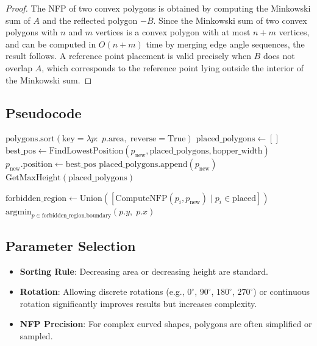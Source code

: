 \begin{proof}
The NFP of two convex polygons is obtained by computing the Minkowski sum of $A$ and the reflected polygon $-B$. Since the Minkowski sum of two convex polygons with $n$ and $m$ vertices is a convex polygon with at most $n + m$ vertices, and can be computed in $O(n+m)$ time by merging edge angle sequences, the result follows. A reference point placement is valid precisely when $B$ does not overlap $A$, which corresponds to the reference point lying outside the interior of the Minkowski sum.
\end{proof}

\subsection{Pseudocode}
\begin{algorithm}[ht]
\label{alg:hopper_optimize}
\begin{algorithmic}[1]
    \State $\text{polygons}.\text{sort}(\text{key}=\lambda p{:}\; p.\text{area},\; \text{reverse}=\text{True})$
    \State $\text{placed\_polygons} \gets []$
        \State $\text{best\_pos} \gets \text{FindLowestPosition}(p_{\text{new}}, \text{placed\_polygons}, \text{hopper\_width})$
        \State $p_{\text{new}}.\text{position} \gets \text{best\_pos}$
        \State $\text{placed\_polygons}.\text{append}(p_{\text{new}})$
    \EndFor
    \State \Return $\text{GetMaxHeight}(\text{placed\_polygons})$
\EndFunction

    \State $\text{forbidden\_region} \gets \text{Union}([\text{ComputeNFP}(p_i, p_{\text{new}}) \mid p_i \in \text{placed}])$
    \State \Return $\text{argmin}_{p \in \text{forbidden\_region.boundary}} (p.y,\; p.x)$
\EndFunction
\end{algorithmic}
\end{algorithm}

\subsection{Parameter Selection}
\begin{itemize}
    \item \textbf{Sorting Rule}: Decreasing area or decreasing height are standard.
    \item \textbf{Rotation}: Allowing discrete rotations (e.g., $0^\circ$, $90^\circ$, $180^\circ$, $270^\circ$) or continuous rotation significantly improves results but increases complexity.
    \item \textbf{NFP Precision}: For complex curved shapes, polygons are often simplified or sampled.
\end{itemize}

